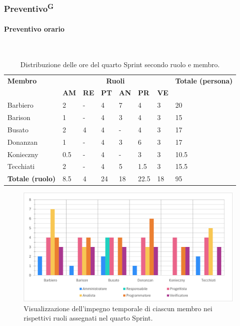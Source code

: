 \documentclass[8pt]{article}
\newcommand{\glossterm}[1]{#1\textsuperscript{G}} %
\newcommand{\subsubsubsection}[1]{\paragraph{#1}\mbox{}\\}
\begin{document}
\subsubsection{\glossterm{Preventivo}}
\subsubsubsection{Preventivo orario}
\begin{table}[ht!]
	\centering
	\begin{tabular}{p{4cm} p{1cm} p{1cm} p{1cm} p{1cm} p{1cm} p{1cm} p{3cm}}
		\toprule
        \textbf{Membro} & \multicolumn{6}{c}{\textbf{Ruoli}} & \textbf{Totale (persona)}\\
		& \textbf{AM} & \textbf{RE} & \textbf{PT} & \textbf{AN} & \textbf{PR} & \textbf{VE}\\
		\midrule
        Barbiero & 2 & - & 4 & 7 & 4 & 3 & 20 \\ 
        Barison & 1 & - & 4 & 3 & 4 & 3 & 15 \\ 
        Busato & 2 & 4 & 4 & - & 4 & 3 & 17 \\ 
        Donanzan & 1 & - & 4 & 3 & 6 & 3 & 17 \\ 
        Konieczny & 0.5 & - & 4 & - & 3 & 3 & 10.5 \\ 
        Tecchiati & 2 & - & 4 & 5 & 1.5 & 3 & 15.5 \\ 
        \midrule
        \textbf{Totale (ruolo)} & 8.5 & 4 & 24 & 18 & 22.5 & 18 & 95 \\ 
        \bottomrule
    \end{tabular}
	\caption{Distribuzione delle ore del quarto Sprint secondo ruolo e membro.}
	\label{table:Distribuzione delle ore del quarto Sprint secondo ruolo e membro}
\end{table}
\begin{figure}[ht!]
    \centering
    \includegraphics[width=15cm]{./images_pdp/istogramma_periodo_4.png}
    \caption{Visualizzazione dell’impegno temporale di ciascun membro nei rispettivi ruoli assegnati
    nel quarto Sprint.}
    \label{figure:Visualizzazione dell’impegno temporale di ciascun membro nei rispettivi ruoli
    assegnati nel quarto Sprint}
\end{figure}
\end{document}
